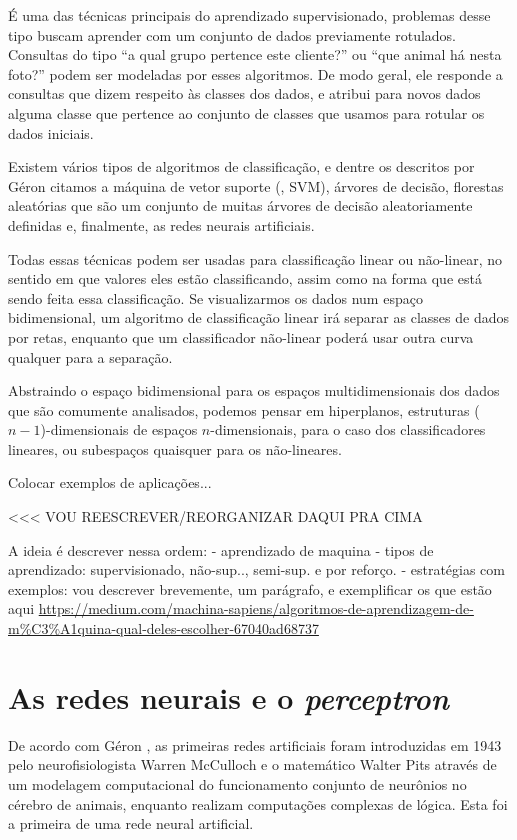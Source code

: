 É uma das técnicas principais do aprendizado supervisionado, problemas desse tipo buscam aprender com um conjunto de dados previamente rotulados. Consultas do tipo ``a qual grupo pertence este cliente?'' ou ``que animal há nesta foto?'' podem ser modeladas por esses algoritmos. De modo geral, ele responde a consultas que dizem respeito às classes dos dados, e atribui para novos dados alguma classe que pertence ao conjunto de classes que usamos para rotular os dados iniciais.

Existem vários tipos de algoritmos de classificação, e dentre os descritos por Géron \citep{hands} citamos a máquina de vetor suporte (, SVM), árvores de decisão, florestas aleatórias que são um conjunto de muitas  árvores de decisão aleatoriamente definidas e, finalmente, as redes neurais artificiais.

Todas essas técnicas podem ser usadas para classificação linear ou não-linear, no sentido em que valores eles estão classificando, assim como na forma que está sendo feita essa classificação. Se visualizarmos os dados num espaço bidimensional, um algoritmo de classificação linear irá separar as classes de dados por retas, enquanto que um classificador não-linear poderá usar outra curva qualquer para a separação. 

Abstraindo o espaço bidimensional para os espaços multidimensionais dos dados que são comumente analisados, podemos pensar em hiperplanos, estruturas ($n{-}1$)-dimensionais de espaços $n$-dimensionais, para o caso dos classificadores lineares, ou subespaços quaisquer para os não-lineares.

Colocar exemplos de aplicações...

<<< VOU REESCREVER/REORGANIZAR DAQUI PRA CIMA 

A ideia é descrever nessa ordem:
- aprendizado de maquina
- tipos de aprendizado: supervisionado, não-sup.., semi-sup. e por reforço.
- estratégias com exemplos: vou descrever brevemente, um parágrafo, e exemplificar os que estão aqui \url{https://medium.com/machina-sapiens/algoritmos-de-aprendizagem-de-m%C3%A1quina-qual-deles-escolher-67040ad68737}


\section{As redes neurais e o \emph{perceptron}}

De acordo com Géron \citep{hands}, as primeiras redes artificiais foram introduzidas em 1943 pelo neurofisiologista Warren McCulloch e o matemático Walter Pits através de um modelagem computacional do funcionamento conjunto de neurônios no cérebro de animais, enquanto realizam computações complexas de lógica. Esta foi a primeira  de uma rede neural artificial.

